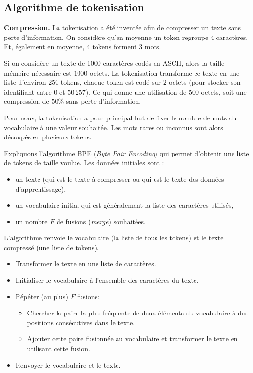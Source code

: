 \documentclass[11pt,class=report,crop=false]{standalone}
\begin{document}
\subsection{Algorithme de tokenisation}

\textbf{Compression.}
La tokenisation a été inventée afin de compresser un texte sans perte d'information.
On considère qu'en moyenne un token regroupe $4$ caractères.
Et, également en moyenne, $4$ tokens forment $3$ mots.

\begin{exemple}
Si on considère un texte de 1000 caractères codés en ASCII, alors la taille mémoire nécessaire est $1000$ octets. La tokenisation transforme ce texte en une liste d'environ $250$ tokens, chaque token est codé sur $2$ octets (pour stocker son identifiant entre $0$ et $50\,257$). Ce qui donne une utilisation de $500$ octets, soit une compression de $50 \%$ sans perte d'information.
\end{exemple}

Pour nous, la tokenisation a pour principal but de fixer le nombre de mots du vocabulaire à une valeur souhaitée. Les mots rares ou inconnus sont alors découpés en plusieurs tokens.

\medskip

Expliquons l'algorithme BPE (\emph{Byte Pair Encoding}) qui permet d'obtenir une liste de tokens de taille voulue.
Les données initiales sont :
\begin{itemize}
	\item un texte (qui est le texte à compresser ou qui est le texte des données d'apprentissage),
	\item un vocabulaire initial qui est généralement la liste des caractères utilisés,
	\item un nombre $F$ de fusions (\emph{merge}) souhaitées.
\end{itemize}
L'algorithme renvoie le vocabulaire (la liste de tous les tokens) et le texte compressé (une liste de tokens).


\begin{algorithme}
\sauteligne
\begin{itemize}
	\item Transformer le texte en une liste de caractères.	
	\item Initialiser le vocabulaire à l'ensemble des caractères du texte.
	\item Répéter (au plus) $F$ fusions:
	\begin{itemize}
		\item Chercher la paire la plus fréquente de deux éléments du vocabulaire à des positions consécutives dans le texte.
		\item Ajouter cette paire fusionnée au vocabulaire et transformer le texte en utilisant cette fusion.
	\end{itemize}
	\item Renvoyer le vocabulaire et le texte.		
\end{itemize}
\end{algorithme}
\end{document}
